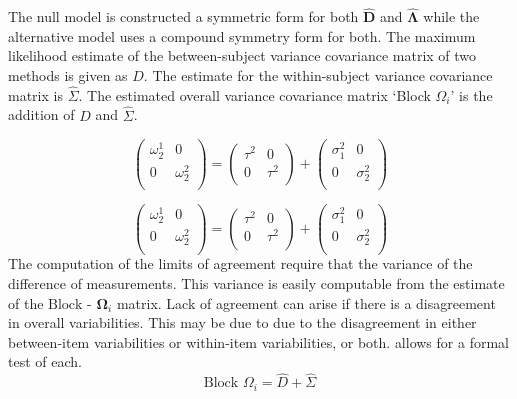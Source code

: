 \documentclass[12pt, a4paper]{report}
\theoremstyle{plain}
\theoremstyle{definition}
\theoremstyle{remark}
\begin{document}
	The null model is constructed a symmetric form for both $\boldsymbol{\hat{D}}$ and $\boldsymbol{\hat{\Lambda}}$ while the alternative model uses a compound symmetry form for both.
	The maximum likelihood estimate of the between-subject variance
	covariance matrix of two methods is given as $D$. The estimate for
	the within-subject variance covariance matrix is $\hat{\Sigma}$.
	The estimated overall variance covariance matrix `Block
	$\Omega_{i}$' is the addition of $\hat{D}$ and $\hat{\Sigma}$.
	
	\[\left(\begin{array}{cc}
	\omega^1_2  & 0 \\
	0 & \omega^2_2 \\
	\end{array}  \right)
	=  \left(
	\begin{array}{cc}
	\tau^2  & 0 \\
	0 & \tau^2 \\
	\end{array} \right)+
	\left(
	\begin{array}{cc}
	\sigma^2_1  & 0 \\
	0 & \sigma^2_2 \\
	\end{array}\right)
	\]
	
	\[\left(\begin{array}{cc}
	\omega^1_2  & 0 \\
	0 & \omega^2_2 \\
	\end{array}  \right)
	=  \left(
	\begin{array}{cc}
	\tau^2  & 0 \\
	0 & \tau^2 \\
	\end{array} \right)+
	\left(
	\begin{array}{cc}
	\sigma^2_1  & 0 \\
	0 & \sigma^2_2 \\
	\end{array}\right)
	\]
			The computation of the limits of agreement require that the variance of the difference of measurements. This variance is easily computable from the estimate of the ${\mbox{Block - }\boldsymbol \Omega_{i}}$ matrix. Lack of agreement can arise if there is a disagreement in overall variabilities. This may be due to due to the disagreement in either between-item
			variabilities or within-item variabilities, or both. \citet{ARoy2009} allows for a formal test of each.
				\begin{equation}
					\mbox{Block  }\Omega_{i} = \hat{D} + \hat{\Sigma}
				\end{equation}
				
\end{document}
